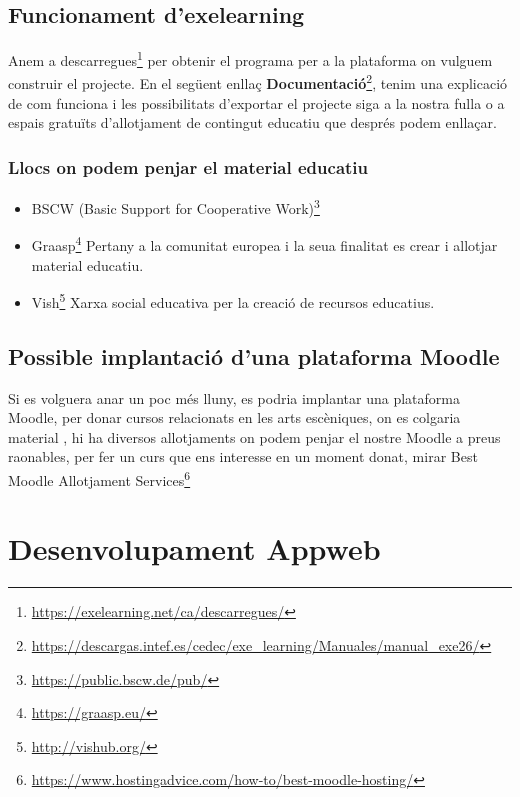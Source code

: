 \documentclass[
  10pt,
]{krantz}
\DeclareRobustCommand{\href}[2]{#2\footnote{\url{#1}}}
\providecommand{\tightlist}{%
  \setlength{\itemsep}{0pt}\setlength{\parskip}{0pt}}
\begin{document}
\hypertarget{funcionament-dexelearning}{%
\section{Funcionament d'exelearning}\label{funcionament-dexelearning}}

Anem a \href{https://exelearning.net/ca/descarregues/}{descarregues} per obtenir el programa per a la plataforma on vulguem construir el projecte. En el següent enllaç \href{https://descargas.intef.es/cedec/exe_learning/Manuales/manual_exe26/}{\textbf{Documentació}}, tenim una explicació de com funciona i les possibilitats d'exportar el projecte siga a la nostra fulla o a espais gratuïts d'allotjament de contingut educatiu que després podem enllaçar.

\hypertarget{llocs-on-podem-penjar-el-material-educatiu}{%
\subsection{Llocs on podem penjar el material educatiu}\label{llocs-on-podem-penjar-el-material-educatiu}}

\begin{itemize}
\tightlist
\item
  \href{https://public.bscw.de/pub/}{BSCW (Basic Support for Cooperative Work)}
\item
  \href{https://graasp.eu/}{Graasp} Pertany a la comunitat europea i la seua finalitat es crear i allotjar material educatiu.
\item
  \href{http://vishub.org/}{Vish} Xarxa social educativa per la creació de recursos educatius.
\end{itemize}

\hypertarget{possible-implantaciuxf3-duna-plataforma-moodle}{%
\section{Possible implantació d'una plataforma Moodle}\label{possible-implantaciuxf3-duna-plataforma-moodle}}

Si es volguera anar un poc més lluny, es podria implantar una plataforma Moodle, per donar cursos relacionats en les arts escèniques, on es colgaria material , hi ha diversos allotjaments on podem penjar el nostre Moodle a preus raonables, per fer un curs que ens interesse en un moment donat, mirar \href{https://www.hostingadvice.com/how-to/best-moodle-hosting/}{Best Moodle Allotjament Services}

\hypertarget{desenvolupament-appweb}{%
\chapter{Desenvolupament Appweb}\label{desenvolupament-appweb}}
\end{document}
